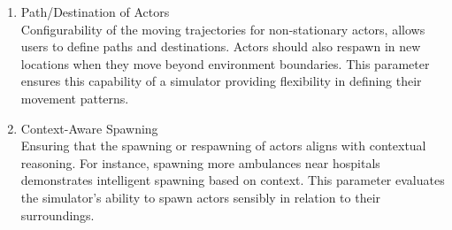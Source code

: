 \documentclass[12pt,twoside,a4paper,parskip]{scrbook} %
\begin{document}
\begin{enumerate}[label=\alph*.]
    \item Path/Destination of Actors\\
    Configurability of the moving trajectories for non-stationary actors, allows users to define paths and destinations. Actors should also respawn in new locations when they move beyond environment boundaries. This parameter ensures this capability of a simulator providing flexibility in defining their movement patterns.
    
    \item Context-Aware Spawning \\
    Ensuring that the spawning or respawning of actors aligns with contextual reasoning. For instance, spawning more ambulances near hospitals demonstrates intelligent spawning based on context. This parameter evaluates the simulator's ability to spawn actors sensibly in relation to their surroundings.
    
\end{enumerate}
\end{document}
